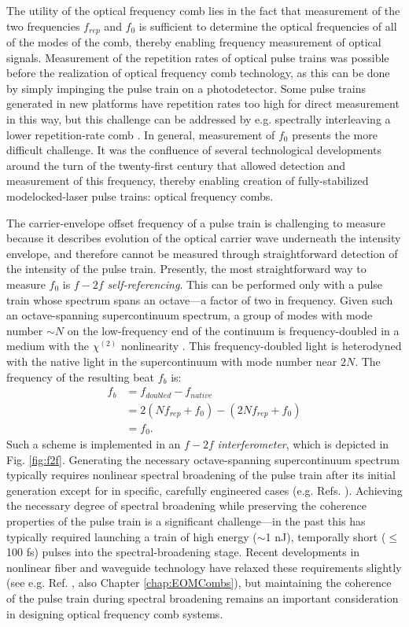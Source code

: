 The utility of the optical frequency comb lies in the fact that measurement of the two frequencies $f_{rep}$ and $f_0$ is sufficient to determine the optical frequencies of all of the modes of the comb, thereby enabling frequency measurement of optical signals. Measurement of the repetition rates of optical pulse trains was possible before the realization of optical frequency comb technology, as this can be done by simply impinging the pulse train on a photodetector. Some pulse trains generated in new platforms have repetition rates too high for direct measurement in this way, but this challenge can be addressed by e.g. spectrally interleaving a lower repetition-rate comb \cite{Spencer2018,Briles2017}. In general, measurement of $f_0$ presents the more difficult challenge. It was the confluence of several technological developments around the turn of the twenty-first century that allowed detection and measurement of this frequency, thereby enabling creation of fully-stabilized modelocked-laser pulse trains: optical frequency combs.

The carrier-envelope offset frequency of a pulse train is challenging to measure because it describes evolution of the optical carrier wave underneath the intensity envelope, and therefore cannot be measured through straightforward detection of the intensity of the pulse train. Presently, the most straightforward way to measure $f_0$ is $f-2f$ \textit{self-referencing}. This can be performed only with a pulse train whose spectrum spans an octave---a factor of two in frequency. Given such an octave-spanning supercontinuum spectrum, a group of modes with mode number $\sim N$ on the low-frequency end of the continuum is frequency-doubled in a medium with the $\chi^{(2)}$ nonlinearity \cite{Boyd2003}. This frequency-doubled light is heterodyned with the native light in the supercontinuum with mode number near $2N$. The frequency of the resulting beat $f_b$ is:
\begin{align}
f_b&=f_{doubled}-f_{native}\\
&=2(Nf_{rep}+f_0)-(2Nf_{rep}+f_0)\\
&=f_0.
\end{align}
Such a scheme is implemented in an $f-2f$ \textit{interferometer}, which is depicted in Fig. \ref{fig:f2f}. Generating the necessary octave-spanning supercontinuum spectrum typically requires nonlinear spectral broadening of the pulse train after its initial generation except for in specific, carefully engineered cases (e.g. Refs. ). Achieving the necessary degree of spectral broadening while preserving the coherence properties of the pulse train is a significant challenge---in the past this has typically required launching a train of high energy ($\sim$1 nJ), temporally short ($\leq$ 100 fs) pulses into the spectral-broadening stage. Recent developments in nonlinear fiber and waveguide technology have relaxed these requirements slightly (see e.g. Ref. , also Chapter \ref{chap:EOMCombs}), but maintaining the coherence of the pulse train during spectral broadening remains an important consideration in designing optical frequency comb systems. 

